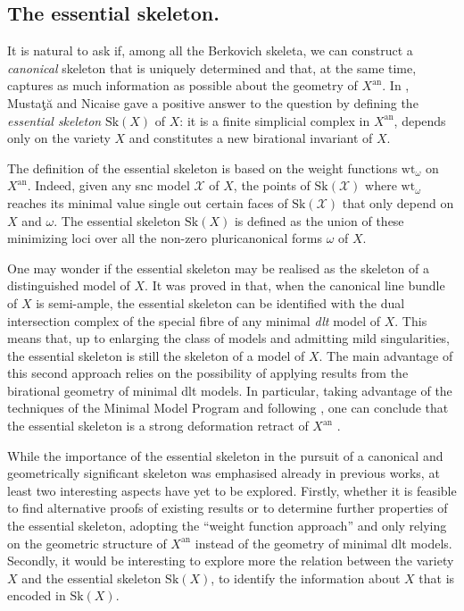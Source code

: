 \documentclass{amsart}%
\numberwithin{equation}{subsection}
\theoremstyle{plain2}
\theoremstyle{definition2}
\theoremstyle{stepstyle}
\theoremstyle{point}
\theoremstyle{subpoint}
\newcommand{\cX}{\ensuremath{\mathscr{X}}}
\newcommand{\an}{\mathrm{an}}
\newcommand{\weight}{\mathrm{wt}}
\newcommand{\Sk}{\mathrm{Sk}}
\begin{document}
\subsection{The essential skeleton.}It is natural to ask if, among all the Berkovich skeleta, we can construct a \textit{canonical} skeleton that is uniquely determined and that, at the same time, captures as much information as possible about the geometry of $X^\an$. In \cite{MustataNicaise}, Musta\c{t}\u{a} and Nicaise gave a positive answer to the question by defining the \textit{essential skeleton} $\Sk(X)$ of $X$: it is a finite simplicial complex in $X^\an$, depends only on the variety $X$ and constitutes a new birational invariant of $X$.

The definition of the essential skeleton is based on the weight functions $\weight_{\omega}$ on $X^\an$. Indeed, given any snc model $\cX$ of $X$, the points of $\Sk(\cX)$ where $\weight_{\omega}$ reaches its minimal value single out certain faces of $\Sk(\cX)$ that only depend on $X$ and $\omega$. The essential skeleton $\Sk(X)$ is defined as the union of these minimizing loci over all the non-zero pluricanonical forms $\omega$ of $X$.

One may wonder if the essential skeleton may be realised as the skeleton of a distinguished model of $X$. It was proved in \cite{NicaiseXu} that, when the canonical line bundle of $X$ is semi-ample, the essential skeleton can be identified with the dual intersection complex of the special fibre of any minimal \textit{dlt} model of $X$. This means that, up to enlarging the class of models and admitting mild singularities, the essential skeleton is still the skeleton of a model of $X$. The main advantage of this second approach relies on the possibility of applying results from the birational geometry of minimal dlt models. In particular, taking advantage of the techniques of the Minimal Model Program and following \cite{deFernexKollarXu2012}, one can conclude that the essential skeleton is a strong deformation retract of $X^\an$ \cite{NicaiseXu}.

While the importance of the essential skeleton in the pursuit of a canonical and geometrically significant skeleton was emphasised already in previous works, at least two interesting aspects have yet to be explored. Firstly, whether it is feasible to find alternative proofs of existing results or to determine further properties of the essential skeleton, adopting the ``weight function approach'' and only relying on the geometric structure of $X^\an$ instead of the geometry of minimal dlt models. Secondly, it would be interesting to explore more the relation between the variety $X$ and the essential skeleton $\Sk(X)$, to identify the information about $X$ that is encoded in $\Sk(X)$.
\end{document}
